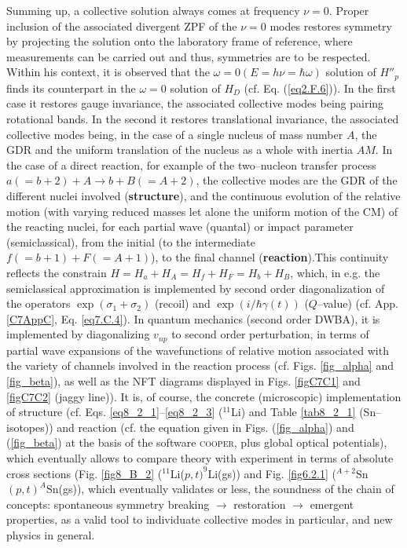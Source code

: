 Summing up, a collective solution always comes at frequency $\nu=0$. Proper inclusion of the associated divergent ZPF of the $\nu=0$ modes restores symmetry by projecting the solution onto the laboratory frame of reference, where measurements can be carried out and thus, symmetries are to be respected. Within his context, it is observed that the $\omega=0 (E=h\nu=\hbar\omega)$ solution of $H''_p$ finds its counterpart in the $\omega=0$ solution of $H_D$ (cf. Eq. (\ref{eq2.F.6})). In the first case it restores gauge invariance, the associated collective modes being pairing rotational bands. In the second it restores translational invariance, the associated collective modes being, in the case of a single nucleus of mass number $A$, the GDR and the uniform translation of the nucleus as a whole with inertia $AM$. In the case of a direct reaction, for example of the two--nucleon transfer process $a(=b+2)+A\rightarrow b+B(=A+2)$, the collective modes are the GDR of the different nuclei involved (\textbf{structure}), and the continuous evolution of the relative motion (with varying reduced masses let alone the uniform motion of the CM) of the reacting nuclei, for each partial wave (quantal) or impact parameter (semiclassical), from the initial (to the intermediate $f(=b+1)+F(=A+1)$), to the final channel (\textbf{reaction}).This continuity reflects the constrain $H=H_a+H_A=H_f+H_F=H_b+H_B$, which, in e.g. the semiclassical approximation  is implemented by second order diagonalization of the operators $\exp(\sigma_1+\sigma_2)$ (recoil) and $\exp(i/\hbar \gamma(t))$ ($Q$--value) (cf. App. \ref{C7AppC}, Eq. \ref{eq7.C.4}). In quantum mechanics (second order DWBA), it is implemented by diagonalizing $v_{np}$ to second order perturbation, in terms of partial wave expansions of the wavefunctions of relative motion associated with the variety of channels involved in the reaction process (cf. Figs. \ref{fig_alpha} and \ref{fig_beta}), as well as the NFT diagrams displayed in Figs. \ref{figC7C1} and \ref{figC7C2} (jaggy line)). It is, of course, the concrete (microscopic) implementation of structure (cf. Eqs. \ref{eq8_2_1}--\ref{eq8_2_3} ($^{11}$Li) and Table \ref{tab8_2_1} (Sn--isotopes)) and reaction (cf. the equation given in Figs. (\ref{fig_alpha}) and (\ref{fig_beta}) at the basis of the software \textsc{cooper},  plus global optical potentials), which eventually allows to compare theory with experiment in terms of absolute cross sections (Fig. \ref{fig8_B_2} ($^{11}$Li($p,t)^9$Li(gs)) and Fig. \ref{fig6.2.1} ($^{A+2}$Sn$(p,t)^A$Sn(gs)), which eventually validates or less, the soundness of the chain of concepts: spontaneous symmetry breaking $\rightarrow$ restoration $\rightarrow$ emergent properties, as a valid tool to individuate collective modes in particular, and new physics in general.


